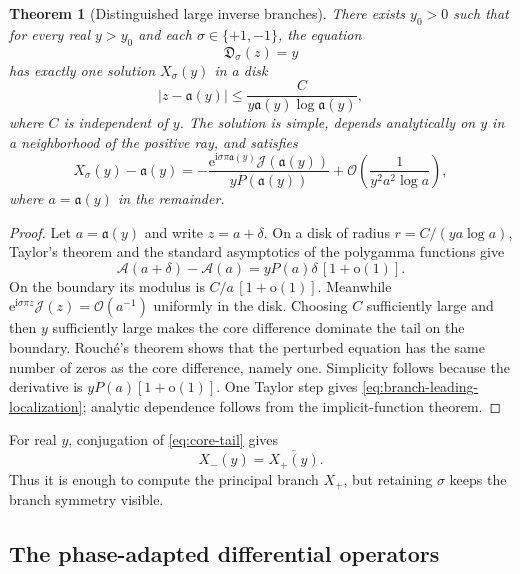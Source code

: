 \documentclass[11pt,a4paper]{article}
\numberwithin{equation}{section}
\newtheorem{theorem}{Theorem}[section]
\theoremstyle{definition}
\theoremstyle{remark}
\newcommand{\e}{\mathrm e}
\newcommand{\ii}{\mathrm i}
\newcommand{\Ord}{\mathcal O}
\newcommand{\littleo}{\mathrm o}
\newcommand{\Sub}{\mathfrak D}
\newcommand{\Core}{\mathcal A}
\newcommand{\Tail}{\mathcal J}
\newcommand{\InvCore}{\mathfrak a}
\begin{document}
\begin{theorem}[Distinguished large inverse branches]
\label{thm:inverse-branch-existence}
There exists $y_0>0$ such that for every real $y>y_0$ and each
$\sigma\in\{+1,-1\}$, the equation
\begin{equation}\label{eq:sub-inverse-equation}
 \Sub_\sigma(z)=y
\end{equation}
has exactly one solution $X_\sigma(y)$ in a disk
\begin{equation}\label{eq:inverse-disk}
 |z-\InvCore(y)|\le
 \frac{C}{y\InvCore(y)\log\InvCore(y)},
\end{equation}
where $C$ is independent of $y$.  The solution is simple, depends
analytically on $y$ in a neighborhood of the positive ray, and satisfies
\begin{equation}\label{eq:branch-leading-localization}
 X_\sigma(y)-\InvCore(y)
 =-\frac{\e^{\ii\sigma\pi\InvCore(y)}\Tail(\InvCore(y))}
 {yP(\InvCore(y))}
 +\Ord\!\left(\frac1{y^2a^2\log a}\right),
\end{equation}
where $a=\InvCore(y)$ in the remainder.
\end{theorem}

\begin{proof}
Let $a=\InvCore(y)$ and write $z=a+\delta$.  On a disk of radius
$r=C/(ya\log a)$, Taylor's theorem and the standard asymptotics of the
polygamma functions give
\[
 \Core(a+\delta)-\Core(a)
 =yP(a)\delta\,[1+\littleo(1)].
\]
On the boundary its modulus is $C/a\,[1+\littleo(1)]$.  Meanwhile
$\e^{\ii\sigma\pi z}\Tail(z)=\Ord(a^{-1})$ uniformly in the disk.  Choosing
$C$ sufficiently large and then $y$ sufficiently large makes the core
difference dominate the tail on the boundary.  Rouch\'e's theorem shows
that the perturbed equation has the same number of zeros as the core
difference, namely one.  Simplicity follows because the derivative is
$yP(a)[1+\littleo(1)]$.  One Taylor step gives
\eqref{eq:branch-leading-localization}; analytic dependence follows from the
implicit-function theorem.
\end{proof}

For real $y$, conjugation of \eqref{eq:core-tail} gives
\begin{equation}\label{eq:conjugate-branches}
 X_-(y)=\overline{X_+(y)}.
\end{equation}
Thus it is enough to compute the principal branch $X_+$, but retaining
$\sigma$ keeps the branch symmetry visible.

\subsection{The phase-adapted differential operators}
\end{document}
